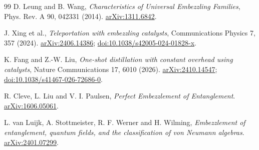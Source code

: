 \documentclass[11pt,a4paper]{article}
\numberwithin{equation}{section}
\theoremstyle{remark}
\begin{document}
\begin{thebibliography}{99}
D. Leung and B. Wang,
\emph{Characteristics of Universal Embezzling Families},
Phys. Rev. A 90, 042331 (2014).
\href{https://arxiv.org/abs/1311.6842}{arXiv:1311.6842}.

J. Xing et al.,
\emph{Teleportation with embezzling catalysts},
Communications Physics 7, 357 (2024).
\href{https://arxiv.org/abs/2406.14386}{arXiv:2406.14386};
\href{https://doi.org/10.1038/s42005-024-01828-x}{doi:10.1038/s42005-024-01828-x}.

K. Fang and Z.-W. Liu,
\emph{One-shot distillation with constant overhead using catalysts},
Nature Communications 17, 6010 (2026).
\href{https://arxiv.org/abs/2410.14547}{arXiv:2410.14547};
\href{https://doi.org/10.1038/s41467-026-72686-0}{doi:10.1038/s41467-026-72686-0}.

R. Cleve, L. Liu and V. I. Paulsen,
\emph{Perfect Embezzlement of Entanglement}.
\href{https://arxiv.org/abs/1606.05061}{arXiv:1606.05061}.

L. van Luijk, A. Stottmeister, R. F. Werner and H. Wilming,
\emph{Embezzlement of entanglement, quantum fields, and the classification
of von Neumann algebras}.
\href{https://arxiv.org/abs/2401.07299}{arXiv:2401.07299}.
\end{thebibliography}
\end{document}
